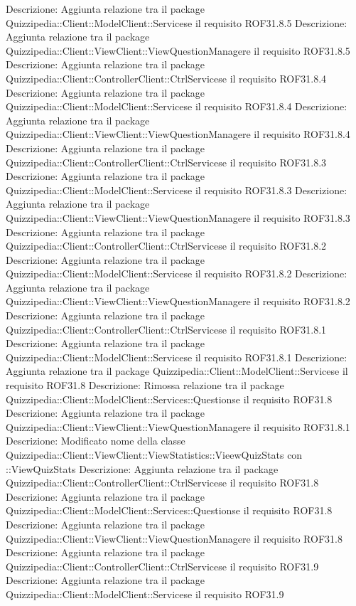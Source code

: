 Descrizione: Aggiunta relazione tra il package Quizzipedia::Client::ModelClient::Servicese il requisito ROF31.8.5 
Descrizione: Aggiunta relazione tra il package Quizzipedia::Client::ViewClient::ViewQuestionManagere il requisito ROF31.8.5 
Descrizione: Aggiunta relazione tra il package Quizzipedia::Client::ControllerClient::CtrlServicese il requisito ROF31.8.4 
Descrizione: Aggiunta relazione tra il package Quizzipedia::Client::ModelClient::Servicese il requisito ROF31.8.4 
Descrizione: Aggiunta relazione tra il package Quizzipedia::Client::ViewClient::ViewQuestionManagere il requisito ROF31.8.4 
Descrizione: Aggiunta relazione tra il package Quizzipedia::Client::ControllerClient::CtrlServicese il requisito ROF31.8.3 
Descrizione: Aggiunta relazione tra il package Quizzipedia::Client::ModelClient::Servicese il requisito ROF31.8.3 
Descrizione: Aggiunta relazione tra il package Quizzipedia::Client::ViewClient::ViewQuestionManagere il requisito ROF31.8.3 
Descrizione: Aggiunta relazione tra il package Quizzipedia::Client::ControllerClient::CtrlServicese il requisito ROF31.8.2 
Descrizione: Aggiunta relazione tra il package Quizzipedia::Client::ModelClient::Servicese il requisito ROF31.8.2 
Descrizione: Aggiunta relazione tra il package Quizzipedia::Client::ViewClient::ViewQuestionManagere il requisito ROF31.8.2 
Descrizione: Aggiunta relazione tra il package Quizzipedia::Client::ControllerClient::CtrlServicese il requisito ROF31.8.1 
Descrizione: Aggiunta relazione tra il package Quizzipedia::Client::ModelClient::Servicese il requisito ROF31.8.1 
Descrizione: Aggiunta relazione tra il package Quizzipedia::Client::ModelClient::Servicese il requisito ROF31.8 
Descrizione: Rimossa relazione tra il package Quizzipedia::Client::ModelClient::Services::Questionse il requisito ROF31.8 
Descrizione: Aggiunta relazione tra il package Quizzipedia::Client::ViewClient::ViewQuestionManagere il requisito ROF31.8.1 
Descrizione: Modificato nome della classe Quizzipedia::Client::ViewClient::ViewStatistics::VieewQuizStats con ::ViewQuizStats 
Descrizione: Aggiunta relazione tra il package Quizzipedia::Client::ControllerClient::CtrlServicese il requisito ROF31.8 
Descrizione: Aggiunta relazione tra il package Quizzipedia::Client::ModelClient::Services::Questionse il requisito ROF31.8 
Descrizione: Aggiunta relazione tra il package Quizzipedia::Client::ViewClient::ViewQuestionManagere il requisito ROF31.8 
Descrizione: Aggiunta relazione tra il package Quizzipedia::Client::ControllerClient::CtrlServicese il requisito ROF31.9 
Descrizione: Aggiunta relazione tra il package Quizzipedia::Client::ModelClient::Servicese il requisito ROF31.9 
